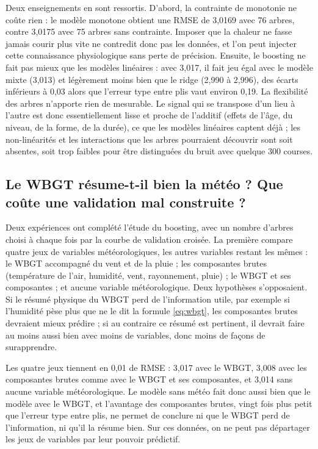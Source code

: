 \documentclass[11pt,a4paper]{article}
\begin{document}
Deux enseignements en sont ressortis. D'abord, la contrainte de monotonie ne coûte rien : le modèle monotone obtient
une RMSE de 3,0169 avec 76 arbres, contre 3,0175 avec 75 arbres sans contrainte. Imposer que la chaleur ne fasse
jamais courir plus vite ne contredit donc pas les données, et l'on peut injecter cette connaissance physiologique
sans perte de précision. Ensuite, le boosting ne fait pas mieux que les modèles linéaires : avec 3,017, il fait jeu
égal avec le modèle mixte (3,013) et légèrement moins bien que le ridge (2,990 à 2,996), des écarts inférieurs à
0,03 alors que l'erreur type entre plis vaut environ 0,19. La flexibilité des arbres n'apporte rien de mesurable. Le
signal qui se transpose d'un lieu à l'autre est donc essentiellement lisse et proche de l'additif (effets de l'âge,
du niveau, de la forme, de la durée), ce que les modèles linéaires captent déjà ; les non-linéarités et les
interactions que les arbres pourraient découvrir sont soit absentes, soit trop faibles pour être distinguées du bruit
avec quelque 300 courses.

\subsection{Le WBGT résume-t-il bien la météo ? Que coûte une validation mal construite ?}\label{sec:meteo_brute}

Deux expériences ont complété l'étude du boosting, avec un nombre d'arbres choisi à chaque fois par la courbe de
validation croisée. La première compare quatre jeux de variables météorologiques, les autres variables restant les
mêmes : le WBGT accompagné du vent et de la pluie ; les composantes brutes (température de l'air, humidité, vent,
rayonnement, pluie) ; le WBGT et ses composantes ; et aucune variable météorologique. Deux hypothèses s'opposaient.
Si le résumé physique du WBGT perd de l'information utile, par exemple si l'humidité pèse plus que ne le dit la
formule \eqref{eq:wbgt}, les composantes brutes devraient mieux prédire ; si au contraire ce résumé est pertinent, il
devrait faire au moins aussi bien avec moins de variables, donc moins de façons de surapprendre.

Les quatre jeux tiennent en 0,01 de RMSE : 3,017 avec le WBGT, 3,008 avec les composantes brutes comme avec le WBGT et
ses composantes, et 3,014 sans aucune variable météorologique. Le modèle sans météo fait donc aussi bien que le modèle
avec le WBGT, et l'avantage des composantes brutes, vingt fois plus petit que l'erreur type entre plis, ne permet de
conclure ni que le WBGT perd de l'information, ni qu'il la résume bien. Sur ces données, on ne peut pas départager les
jeux de variables par leur pouvoir prédictif.
\end{document}

